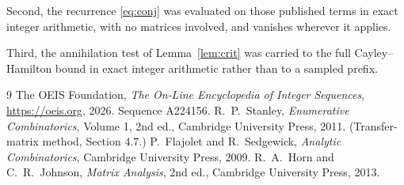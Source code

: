\documentclass[11pt,a4paper]{article}
\theoremstyle{plain}
\theoremstyle{definition}
\begin{document}
Second, the recurrence \eqref{eq:conj} was evaluated on those published terms in exact
integer arithmetic, with no matrices involved, and vanishes wherever it applies.

Third, the annihilation test of Lemma~\ref{lem:crit} was carried to the full
Cayley--Hamilton bound in exact integer arithmetic rather than to a sampled prefix.

\begin{thebibliography}{9}
 The OEIS Foundation, \emph{The On-Line Encyclopedia of Integer
Sequences}, \url{https://oeis.org}, 2026. Sequence A224156.
 R.~P.~Stanley, \emph{Enumerative Combinatorics}, Volume 1, 2nd ed.,
Cambridge University Press, 2011. (Transfer-matrix method, Section 4.7.)
 P.~Flajolet and R.~Sedgewick, \emph{Analytic Combinatorics}, Cambridge
University Press, 2009.
 R.~A.~Horn and C.~R.~Johnson, \emph{Matrix Analysis}, 2nd ed., Cambridge
University Press, 2013.
\end{thebibliography}
\end{document}
